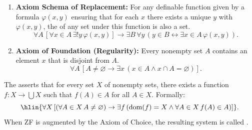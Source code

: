 \begin{definition}
\begin{enumerate}
  \item \textbf{Axiom Schema of Replacement:} For any definable function given by a formula $\varphi(x,y)$ ensuring that for each $x$ there exists a unique $y$ with $\varphi(x,y)$, the  of any set under this function is also a set.
  $$\forall A\, [\forall x \in A\, \exists! y\, \varphi(x,y)] \rightarrow \exists B\, \forall y\, (y \in B \leftrightarrow \exists x \in A\, \varphi(x,y)).$$

  \item \textbf{Axiom of Foundation (Regularity):} Every nonempty set $A$ contains an element $x$ that is disjoint from $A$.
  $$\forall A\, [A \neq \varnothing \rightarrow \exists x\, (x \in A \wedge x \cap A = \varnothing)].$$

\end{enumerate}
The  asserts that for every set $X$ of nonempty sets, there exists a function $f : X \to \bigcup X$ such that $f(A) \in A$ for all $A \in X$. Formally:
$$\hlin{\forall X\, [(\forall A \in X\, A \neq \varnothing) \rightarrow \exists f\, (\operatorname{dom}(f) = X \wedge \forall A \in X\, f(A) \in A)]}.$$
When ZF is augmented by the Axiom of Choice, the resulting system is called .
\end{definition}